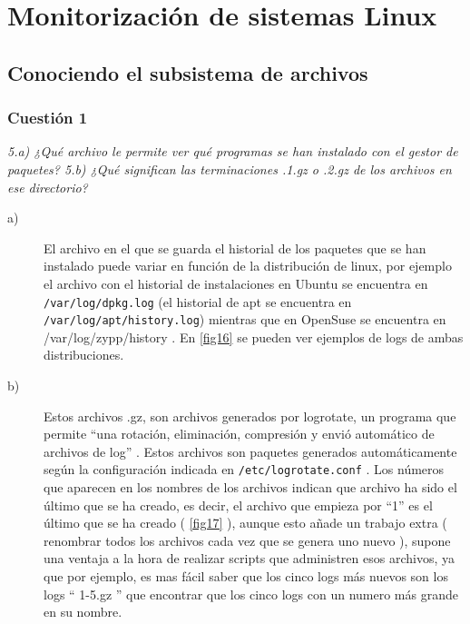 



\maketitle %
\newpage %
\tableofcontents %
\listoffigures
\newpage

\section{Monitorización de sistemas Linux}
\subsection{Conociendo el subsistema de archivos}


\subsubsection{Cuestión 1}
\textit{5.a) ¿Qué archivo le permite ver qué programas se han instalado con el gestor de paquetes? 5.b) ¿Qué significan las terminaciones .1.gz o .2.gz de los archivos en ese directorio?}

\begin{description}
  \item[a)] El archivo en el que se guarda el historial de los paquetes que se han instalado puede variar en función de la distribución de linux, por ejemplo el archivo con el historial de instalaciones en Ubuntu se encuentra en  \texttt{/var/log/dpkg.log} (el historial de apt se encuentra en \texttt{/var/log/apt/history.log}) mientras que en OpenSuse se encuentra en /var/log/zypp/history \cite{log1} \cite{log2}. En \cref{fig16} se pueden ver ejemplos de logs de ambas distribuciones. 
  
  \item[b)] Estos archivos .gz, son archivos generados por logrotate, un programa que permite  ``una rotación, eliminación, compresión y envió automático de archivos de log'' \cite{logrot1}. Estos archivos son paquetes generados automáticamente según la configuración indicada en \texttt{/etc/logrotate.conf} \cite{logrot}. Los números que aparecen en los nombres de los archivos indican que archivo ha sido el último que se ha creado, es decir, el archivo que empieza por ``1'' es el último que se ha creado ( \cref{fig17} ), aunque esto añade un trabajo extra ( renombrar todos los archivos cada vez que se genera uno nuevo ), supone una ventaja a la hora de realizar scripts que administren esos archivos, ya que por ejemplo, es mas fácil saber que los cinco logs más nuevos son los logs `` 1-5.gz '' que encontrar que los cinco logs con un numero más grande en su nombre.
\end{description}

